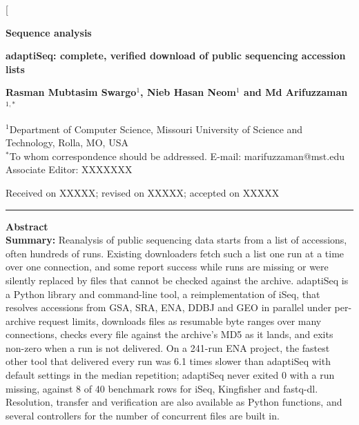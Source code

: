 \documentclass[9pt,twocolumn,a4paper]{extarticle}
\begin{document}
\thispagestyle{first}

\twocolumn[
\begin{@twocolumnfalse}
{\sffamily\footnotesize\color{oup}\textbf{Sequence analysis}}\par\vspace{-1pt}
{\sffamily\bfseries\fontsize{17}{20}\selectfont adaptiSeq: complete, verified download of public sequencing accession lists}\par\vspace{6pt}
{\sffamily\bfseries\small Rasman Mubtasim Swargo$^{1}$, Nieb Hasan Neom$^{1}$ and Md Arifuzzaman$^{1,*}$}\par\vspace{3pt}
{\footnotesize $^{1}$Department of Computer Science, Missouri University of Science and Technology, Rolla, MO, USA\\
$^{*}$To whom correspondence should be addressed. E-mail: marifuzzaman@mst.edu\\
Associate Editor: XXXXXXX\par\vspace{1pt}
Received on XXXXX; revised on XXXXX; accepted on XXXXX}\par\vspace{4pt}
\hrule\vspace{5pt}
{\small
\noindent\textsf{\textbf{Abstract}}\\
\textbf{Summary:} Reanalysis of public sequencing data starts from a list of accessions, often hundreds of runs. Existing downloaders fetch such a list one run at a time over one connection, and some report success while runs are missing or were silently replaced by files that cannot be checked against the archive. adaptiSeq is a Python library and command-line tool, a reimplementation of iSeq, that resolves accessions from GSA, SRA, ENA, DDBJ and GEO in parallel under per-archive request limits, downloads files as resumable byte ranges over many connections, checks every file against the archive's MD5 as it lands, and exits non-zero when a run is not delivered. On a 241-run ENA project, the fastest other tool that delivered every run was 6.1 times slower than adaptiSeq with default settings in the median repetition; adaptiSeq never exited 0 with a run missing, against 8 of 40 benchmark rows for iSeq, Kingfisher and fastq-dl. Resolution, transfer and verification are also available as Python functions, and several controllers for the number of concurrent files are built in.\par\vspace{3pt}
}
\end{@twocolumnfalse}
\end{document}
